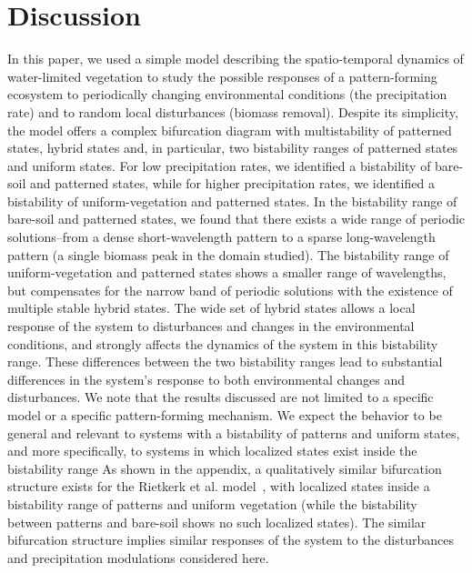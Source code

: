 \documentclass[aps,prl,preprint,superscriptaddress,floatfix]{revtex4-1}
\begin{document}
\section{Discussion}\label{discuss}
In this paper, we used a simple model describing the spatio-temporal dynamics of water-limited vegetation to study the possible responses of a pattern-forming ecosystem to 
periodically changing environmental conditions (the precipitation rate) and to random local disturbances (biomass removal).
Despite its simplicity, the model offers a complex bifurcation diagram with multistability of patterned states, hybrid states and, in particular, two bistability ranges of patterned states and uniform states. 
For low precipitation rates, we identified a bistability of bare-soil and patterned states, while for higher precipitation rates, we identified a bistability of uniform-vegetation and patterned states. 
In the bistability range of bare-soil and patterned states, we found that there exists a wide range of periodic solutions--from a dense short-wavelength pattern to a sparse long-wavelength pattern (a single biomass peak in the domain studied). 
The bistability range of uniform-vegetation and patterned states shows a smaller range of wavelengths, but compensates for the narrow band of periodic solutions with the existence of multiple stable hybrid states. 
The wide set of hybrid states allows a local response of the system to disturbances and changes in the environmental conditions, and strongly affects the dynamics of the system in this bistability range. 
These differences between the two bistability ranges lead to substantial differences in the system's response to both environmental changes and disturbances.
We note that the results discussed are not limited to a specific model or a specific pattern-forming mechanism. 
We expect the behavior to be general and relevant to systems with a bistability of patterns and uniform states, and more specifically, to systems in which localized states exist inside the bistability range
As shown in the appendix, a qualitatively similar bifurcation structure exists for the Rietkerk et al. model~\cite{Rietkerk2002an}, 
with localized states inside a bistability range of patterns and uniform vegetation (while the bistability between patterns and bare-soil shows no such localized states). 
The similar bifurcation structure implies similar responses of the system to the disturbances and precipitation modulations considered here.
\end{document}
